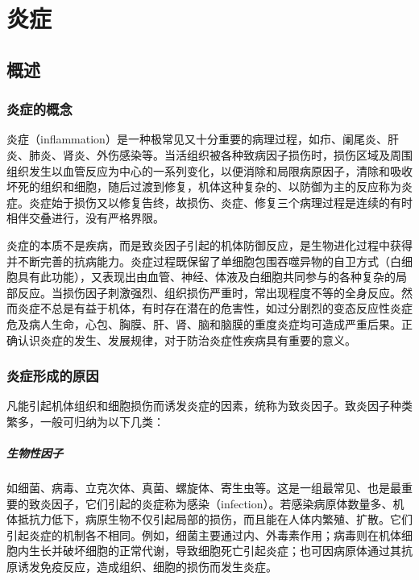 \chapter{炎症}


\section{概述}

\subsection{炎症的概念}

炎症（inflammation）是一种极常见又十分重要的病理过程，如疖、阑尾炎、肝炎、肺炎、肾炎、外伤感染等。当活组织被各种致病因子损伤时，损伤区域及周围组织发生以血管反应为中心的一系列变化，以便消除和局限病原因子，清除和吸收坏死的组织和细胞，随后过渡到修复，机体这种复杂的、以防御为主的反应称为炎症。炎症始于损伤又以修复告终，故损伤、炎症、修复三个病理过程是连续的有时相伴交叠进行，没有严格界限。

炎症的本质不是疾病，而是致炎因子引起的机体防御反应，是生物进化过程中获得并不断完善的抗病能力。炎症过程既保留了单细胞包围吞噬异物的自卫方式（白细胞具有此功能），又表现出由血管、神经、体液及白细胞共同参与的各种复杂的局部反应。当损伤因子刺激强烈、组织损伤严重时，常出现程度不等的全身反应。然而炎症不总是有益于机体，有时存在潜在的危害性，如过分剧烈的变态反应性炎症危及病人生命，心包、胸膜、肝、肾、脑和脑膜的重度炎症均可造成严重后果。正确认识炎症的发生、发展规律，对于防治炎症性疾病具有重要的意义。

\subsection{炎症形成的原因}

凡能引起机体组织和细胞损伤而诱发炎症的因素，统称为致炎因子。致炎因子种类繁多，一般可归纳为以下几类：

\paragraph{生物性因子}
如细菌、病毒、立克次体、真菌、螺旋体、寄生虫等。这是一组最常见、也是最重要的致炎因子，它们引起的炎症称为感染（infection）。若感染病原体数量多、机体抵抗力低下，病原生物不仅引起局部的损伤，而且能在人体内繁殖、扩散。它们引起炎症的机制各不相同。例如，细菌主要通过内、外毒素作用；病毒则在机体细胞内生长并破坏细胞的正常代谢，导致细胞死亡引起炎症；也可因病原体通过其抗原诱发免疫反应，造成组织、细胞的损伤而发生炎症。

